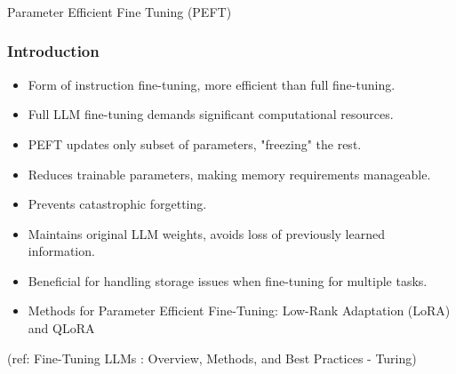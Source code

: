 
\begin{frame}[fragile]\frametitle{}
\begin{center}
{\Large Parameter Efficient Fine Tuning (PEFT)}
\end{center}
\end{frame}

\begin{frame}[fragile]\frametitle{Introduction}

  \begin{itemize}
    \item Form of instruction fine-tuning, more efficient than full fine-tuning.
    \item Full LLM fine-tuning demands significant computational resources.
    \item PEFT updates only subset of parameters, "freezing" the rest.
    \item Reduces trainable parameters, making memory requirements manageable.
    \item Prevents catastrophic forgetting.
    \item Maintains original LLM weights, avoids loss of previously learned information.
    \item Beneficial for handling storage issues when fine-tuning for multiple tasks.
	\item Methods for Parameter Efficient Fine-Tuning: Low-Rank Adaptation (LoRA) and QLoRA
  \end{itemize}
  
  {\tiny (ref: Fine-Tuning LLMs : Overview, Methods, and Best Practices - Turing)}
  
\end{frame}


